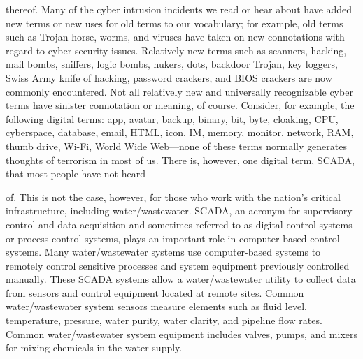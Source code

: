\documentclass{article}
\begin{document}
thereof. Many of the cyber intrusion incidents we read or hear about
have added new terms or new uses for old terms to our vocabulary; for
example, old terms such as Trojan horse, worms, and viruses have taken
on new connotations with regard to cyber security issues. Relatively new
terms such as scanners, hacking, mail bombs, sniffers, logic bombs,
nukers, dots, backdoor Trojan, key loggers, Swiss Army knife of hacking,
password crackers, and BIOS crackers are now commonly encountered. Not
all relatively new and universally recognizable cyber terms have
sinister connotation or meaning, of course. Consider, for example, the
following digital terms: app, avatar, backup, binary, bit, byte,
cloaking, CPU, cyberspace, database, email, HTML, icon, IM, memory,
monitor, network, RAM, thumb drive, Wi-Fi, World Wide Web---none of
these terms normally generates thoughts of terrorism in most of us.
There is, however, one digital term, SCADA, that most people have not
heard

of. This is not the case, however, for those who work with the nation's
critical infrastructure, including water/wastewater. SCADA, an acronym
for supervisory control and data acquisition and sometimes referred to
as digital control systems or process control systems, plays an
important role in computer-based control systems. Many water/wastewater
systems use computer-based systems to remotely control sensitive
processes and system equipment previously controlled manually. These
SCADA systems allow a water/wastewater utility to collect data from
sensors and control equipment located at remote sites. Common
water/wastewater system sensors measure elements such as fluid level,
temperature, pressure, water purity, water clarity, and pipeline flow
rates. Common water/wastewater system equipment includes valves, pumps,
and mixers for mixing chemicals in the water supply.
\end{document}
